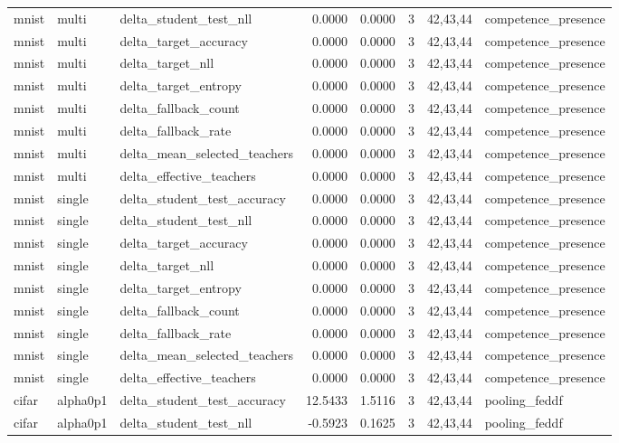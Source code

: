 \begin{tabular}{lllrrrll}
mnist & multi & delta\_student\_test\_nll & 0.0000 & 0.0000 & 3 & 42,43,44 & competence\_presence \\
mnist & multi & delta\_target\_accuracy & 0.0000 & 0.0000 & 3 & 42,43,44 & competence\_presence \\
mnist & multi & delta\_target\_nll & 0.0000 & 0.0000 & 3 & 42,43,44 & competence\_presence \\
mnist & multi & delta\_target\_entropy & 0.0000 & 0.0000 & 3 & 42,43,44 & competence\_presence \\
mnist & multi & delta\_fallback\_count & 0.0000 & 0.0000 & 3 & 42,43,44 & competence\_presence \\
mnist & multi & delta\_fallback\_rate & 0.0000 & 0.0000 & 3 & 42,43,44 & competence\_presence \\
mnist & multi & delta\_mean\_selected\_teachers & 0.0000 & 0.0000 & 3 & 42,43,44 & competence\_presence \\
mnist & multi & delta\_effective\_teachers & 0.0000 & 0.0000 & 3 & 42,43,44 & competence\_presence \\
mnist & single & delta\_student\_test\_accuracy & 0.0000 & 0.0000 & 3 & 42,43,44 & competence\_presence \\
mnist & single & delta\_student\_test\_nll & 0.0000 & 0.0000 & 3 & 42,43,44 & competence\_presence \\
mnist & single & delta\_target\_accuracy & 0.0000 & 0.0000 & 3 & 42,43,44 & competence\_presence \\
mnist & single & delta\_target\_nll & 0.0000 & 0.0000 & 3 & 42,43,44 & competence\_presence \\
mnist & single & delta\_target\_entropy & 0.0000 & 0.0000 & 3 & 42,43,44 & competence\_presence \\
mnist & single & delta\_fallback\_count & 0.0000 & 0.0000 & 3 & 42,43,44 & competence\_presence \\
mnist & single & delta\_fallback\_rate & 0.0000 & 0.0000 & 3 & 42,43,44 & competence\_presence \\
mnist & single & delta\_mean\_selected\_teachers & 0.0000 & 0.0000 & 3 & 42,43,44 & competence\_presence \\
mnist & single & delta\_effective\_teachers & 0.0000 & 0.0000 & 3 & 42,43,44 & competence\_presence \\
cifar & alpha0p1 & delta\_student\_test\_accuracy & 12.5433 & 1.5116 & 3 & 42,43,44 & pooling\_feddf \\
cifar & alpha0p1 & delta\_student\_test\_nll & -0.5923 & 0.1625 & 3 & 42,43,44 & pooling\_feddf \\

\end{tabular}
